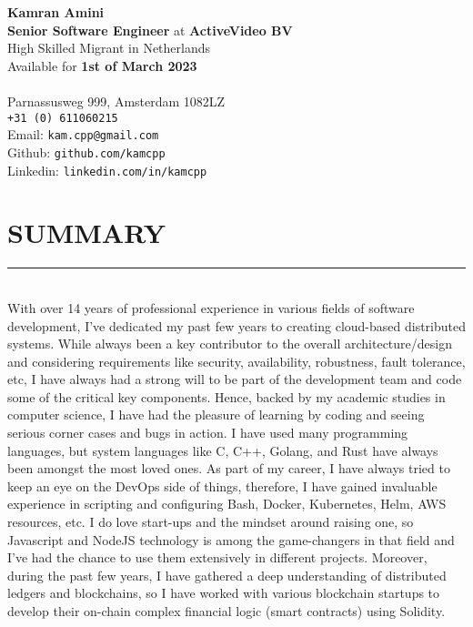 \documentclass[10pt,a4paper]{article}
\begin{document}
\noindent \textbf{Kamran Amini} \\
\noindent \small \textbf{Senior Software Engineer} at \textbf{ActiveVideo BV} \\
\noindent \small High Skilled Migrant in Netherlands \\
\noindent \small \small \small Available for \textbf{1st of March 2023} \\

\\

\noindent Parnassusweg 999, Amsterdam 1082LZ \\
\texttt{+31 (0) 611060215} \\
Email: \texttt{kam.cpp@gmail.com} \\
Github: \texttt{github.com/kamcpp} \\
Linkedin: \texttt{linkedin.com/in/kamcpp}

\section{SUMMARY}
\noindent \rule {18.0cm}{0.2pt} \\
\small With over 14 years of professional experience in various fields of software development, I've dedicated my past few years to creating cloud-based distributed systems. While always been a key contributor to the overall architecture/design and considering requirements like security, availability, robustness, fault tolerance, etc, I have always had a strong will to be part of the development team and code some of the critical key components. Hence, backed by my academic studies in computer science, I have had the pleasure of learning by coding and seeing serious corner cases and bugs in action. I have used many programming languages, but system languages like C, C++, Golang, and Rust have always been amongst the most loved ones. As part of my career, I have always tried to keep an eye on the DevOps side of things, therefore, I have gained invaluable experience in scripting and configuring Bash, Docker, Kubernetes, Helm, AWS resources, etc. I do love start-ups and the mindset around raising one, so Javascript and NodeJS technology is among the game-changers in that field and I've had the chance to use them extensively in different projects. Moreover, during the past few years, I have gathered a deep understanding of distributed ledgers and blockchains, so I have worked with various blockchain startups to develop their on-chain complex financial logic (smart contracts) using Solidity.
\end{document}
